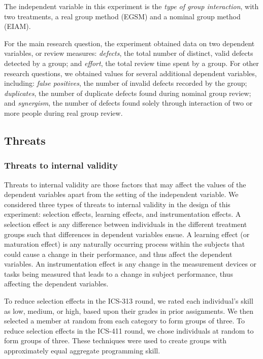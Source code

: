 The independent variable in this experiment is the {\em type of group interaction},
with two treatments, a real group method (EGSM) and a nominal group method
(EIAM). 

For the main research question, the experiment obtained data on two
dependent variables, or review measures: {\em defects}, the total number of
distinct, valid defects detected by a group; and {\em effort}, the total
review time spent by a group.  For other research questions, we obtained
values for several additional dependent variables, including: {\em false
  positives}, the number of invalid defects recorded by the group; {\em
  duplicates}, the number of duplicate defects found during nominal group
review; and {\em synergism}, the number of defects found solely through interaction
of two or more people during real group review.

\subsection {Threats}

\subsubsection{Threats to internal validity}


Threats to internal validity are those factors that may affect the values
of the dependent variables apart from the setting of the independent
variable.  We considered three types of threats to internal validity in the
design of this experiment: selection effects, learning effects, and
instrumentation effects. A selection effect is any difference between
individuals in the different treatment groups such that differences in
dependent variables ensue. A learning effect (or maturation effect) is any
naturally occurring process within the subjects that could cause a change
in their performance, and thus affect the dependent variables.  An
instrumentation effect is any change in the measurement devices or tasks
being measured that leads to a change in subject performance, thus 
affecting the dependent variables. 

To reduce selection effects in the ICS-313 round, we rated each
individual's skill as low, medium, or high, based upon their grades in
prior assignments. We then selected a member at random from each category
to form groups of three. To reduce selection effects in the ICS-411
round, we chose individuals at random to form groups of three. 
These techniques were used to create groups with approximately equal 
aggregate programming skill.

